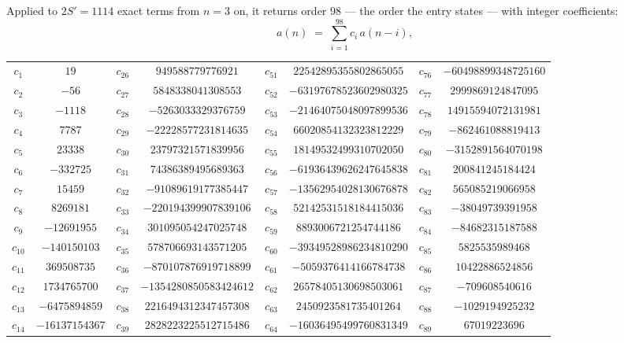 \documentclass[11pt,a4paper]{article}
\theoremstyle{plain}
\theoremstyle{definition}
\begin{document}
Applied to $2S'=1114$ exact terms from $n=3$ on, it returns order $98$ --- the
order the entry states --- with integer coefficients:
\[
a(n)\;=\;\sum_{i=1}^{98}c_i\,a(n-i),
\]
\begin{center}\small
\begin{tabular}{cccccccc}
$c_{1}$ & $19$ & $c_{26}$ & $949588779776921$ & $c_{51}$ & $22542895355802865055$ & $c_{76}$ & $-60498899348725160$ \\
$c_{2}$ & $-56$ & $c_{27}$ & $5848338041308553$ & $c_{52}$ & $-63197678523602980325$ & $c_{77}$ & $2999869124847095$ \\
$c_{3}$ & $-1118$ & $c_{28}$ & $-5263033329376759$ & $c_{53}$ & $-21464075048097899536$ & $c_{78}$ & $14915594072131981$ \\
$c_{4}$ & $7787$ & $c_{29}$ & $-22228577231814635$ & $c_{54}$ & $66020854132323812229$ & $c_{79}$ & $-862461088819413$ \\
$c_{5}$ & $23338$ & $c_{30}$ & $23797321571839956$ & $c_{55}$ & $18149532499310702050$ & $c_{80}$ & $-3152891564070198$ \\
$c_{6}$ & $-332725$ & $c_{31}$ & $74386389495689363$ & $c_{56}$ & $-61936439626247645838$ & $c_{81}$ & $200841245184424$ \\
$c_{7}$ & $15459$ & $c_{32}$ & $-91089619177385447$ & $c_{57}$ & $-13562954028130676878$ & $c_{82}$ & $565085219066958$ \\
$c_{8}$ & $8269181$ & $c_{33}$ & $-220194399907839106$ & $c_{58}$ & $52142531518184415036$ & $c_{83}$ & $-38049739391958$ \\
$c_{9}$ & $-12691955$ & $c_{34}$ & $301095054247025748$ & $c_{59}$ & $8893006721254744186$ & $c_{84}$ & $-84682315187588$ \\
$c_{10}$ & $-140150103$ & $c_{35}$ & $578706693143571205$ & $c_{60}$ & $-39349528986234810290$ & $c_{85}$ & $5825535989468$ \\
$c_{11}$ & $369508735$ & $c_{36}$ & $-870107876919718899$ & $c_{61}$ & $-5059376414166784738$ & $c_{86}$ & $10422886524856$ \\
$c_{12}$ & $1734765700$ & $c_{37}$ & $-1354280850583424612$ & $c_{62}$ & $26578405130698503061$ & $c_{87}$ & $-709608540616$ \\
$c_{13}$ & $-6475894859$ & $c_{38}$ & $2216494312347457308$ & $c_{63}$ & $2450923581735401264$ & $c_{88}$ & $-1029194925232$ \\
$c_{14}$ & $-16137154367$ & $c_{39}$ & $2828223225512715486$ & $c_{64}$ & $-16036495499760831349$ & $c_{89}$ & $67019223696$ \\

\end{tabular}
\end{center}
\end{document}
